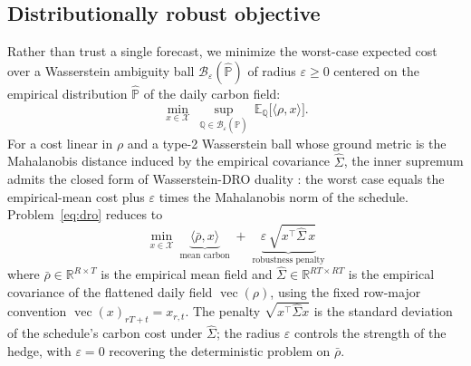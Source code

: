 \documentclass[11pt]{article}
\newcommand{\vecx}{\operatorname{vec}}
\newcommand{\R}{\mathbb{R}}
\newcommand{\E}{\mathbb{E}}
\begin{document}
\subsection{Distributionally robust objective}
Rather than trust a single forecast, we minimize the worst-case expected cost over a Wasserstein
ambiguity ball $\mathcal{B}_\varepsilon(\hat{\mathbb{P}})$ of radius $\varepsilon\ge 0$ centered on the
empirical distribution $\hat{\mathbb{P}}$ of the daily carbon field:
\begin{equation}
  \min_{x\in\mathcal{X}}\ \sup_{\mathbb{Q}\in\mathcal{B}_\varepsilon(\hat{\mathbb{P}})}\
  \E_{\mathbb{Q}}\!\big[\langle \rho, x\rangle\big].
  \label{eq:dro}
\end{equation}
For a cost linear in $\rho$ and a type-2 Wasserstein ball whose ground metric is the Mahalanobis
distance induced by the empirical covariance $\hat\Sigma$, the inner supremum admits the closed form of
Wasserstein-DRO duality \cite{esfahani2018}: the worst case equals the empirical-mean cost plus
$\varepsilon$ times the Mahalanobis norm of the schedule. Problem~\eqref{eq:dro} reduces to
\begin{equation}
  \boxed{\ \min_{x\in\mathcal{X}}\ \underbrace{\langle \bar\rho, x\rangle}_{\text{mean carbon}}
  \;+\; \underbrace{\varepsilon\,\sqrt{x^{\top}\hat\Sigma\,x}}_{\text{robustness penalty}}\ }
  \label{eq:obj}
\end{equation}
where $\bar\rho\in\R^{R\times T}$ is the empirical mean field and $\hat\Sigma\in\R^{RT\times RT}$ is the
empirical covariance of the flattened daily field $\vecx(\rho)$, using the fixed row-major convention
$\vecx(x)_{rT+t}=x_{r,t}$. The penalty $\sqrt{x^\top\hat\Sigma x}$ is the standard deviation of the
schedule's carbon cost under $\hat\Sigma$; the radius $\varepsilon$ controls the strength of the hedge,
with $\varepsilon=0$ recovering the deterministic problem on $\bar\rho$.
\end{document}
